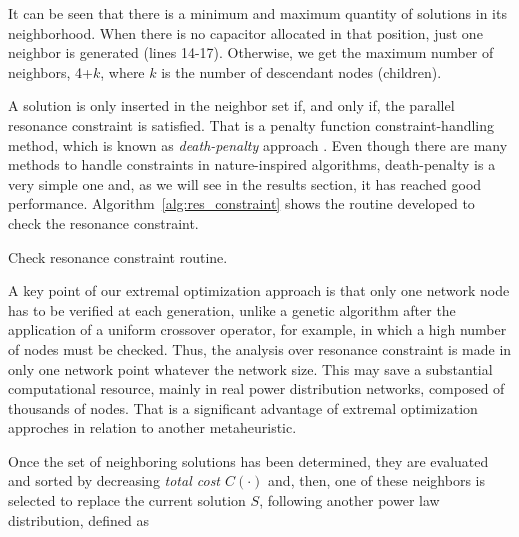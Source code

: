 \documentclass[11pt]{article}
\begin{document}
It can be seen that there is a minimum and maximum quantity of solutions in 
its neighborhood. When there is no capacitor allocated in that position, just
one neighbor is generated (lines 14-17). Otherwise, we get the maximum number of 
neighbors, 4+$k$, where $k$ is the number of descendant nodes (children). 

A solution is only inserted in the neighbor set if, and only if, the parallel resonance constraint
is satisfied. That is a penalty function constraint-handling method, which is known as 
\emph{death-penalty} approach \citep{MezuraMontes2011}. Even though there are many
methods to handle constraints in nature-inspired algorithms, death-penalty
is a very simple one and, as we will see in the results section, it has reached good performance.
Algorithm~\ref{alg:res_constraint} shows the routine developed to check the resonance constraint.

	
	
\begin{algorithm}
    \caption{Check resonance constraint routine.}
    \label{alg:res_constraint}
\end{algorithm}

A key point of our extremal optimization approach is that only one network node has to be 
verified at each generation, unlike a genetic algorithm after the application of a uniform crossover operator, 
for example, in which a high number of nodes must be checked. Thus, the analysis over resonance constraint 
is made in only one network point whatever the network size. This may save 
a substantial computational resource, mainly in real power distribution networks,
composed of thousands of nodes. That is a significant advantage of extremal optimization 
approches in relation to another metaheuristic.
 

Once the set of neighboring solutions has been determined, they are evaluated and sorted 
by decreasing \emph{total cost $C(\cdot)$} and, then, one of these neighbors 
is selected to replace the current solution $S$, following another power law 
distribution, defined as \citep{Zeng2010}
\end{document}
